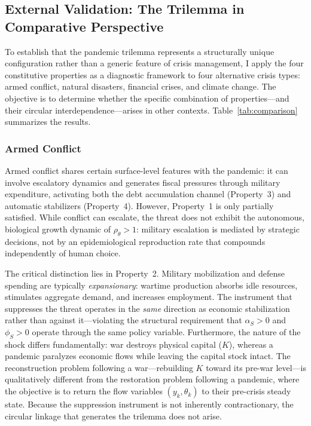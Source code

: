 \documentclass[12pt, a4paper]{article}
\begin{document}
\subsection{External Validation: The Trilemma in Comparative Perspective}
\label{subsec:comparison}

To establish that the pandemic trilemma represents a structurally unique configuration rather than a generic feature of crisis management, I apply the four constitutive properties as a diagnostic framework to four alternative crisis types: armed conflict, natural disasters, financial crises, and climate change. The objective is to determine whether the specific combination of properties---and their circular interdependence---arises in other contexts. Table~\ref{tab:comparison} summarizes the results.

\subsubsection*{Armed Conflict}

Armed conflict shares certain surface-level features with the pandemic: it can involve escalatory dynamics and generates fiscal pressures through military expenditure, activating both the debt accumulation channel (Property~3) and automatic stabilizers (Property~4). However, Property~1 is only partially satisfied. While conflict can escalate, the threat does not exhibit the autonomous, biological growth dynamic of $\rho_\theta > 1$: military escalation is mediated by strategic decisions, not by an epidemiological reproduction rate that compounds independently of human choice.

The critical distinction lies in Property~2. Military mobilization and defense spending are typically \textit{expansionary}: wartime production absorbs idle resources, stimulates aggregate demand, and increases employment. The instrument that suppresses the threat operates in the \textit{same} direction as economic stabilization rather than against it---violating the structural requirement that $\alpha_S > 0$ and $\phi_S > 0$ operate through the same policy variable. Furthermore, the nature of the shock differs fundamentally: war destroys physical capital ($K$), whereas a pandemic paralyzes economic flows while leaving the capital stock intact. The reconstruction problem following a war---rebuilding $K$ toward its pre-war level---is qualitatively different from the restoration problem following a pandemic, where the objective is to return the flow variables $(y_k, \theta_k)$ to their pre-crisis steady state. Because the suppression instrument is not inherently contractionary, the circular linkage that generates the trilemma does not arise.
\end{document}
